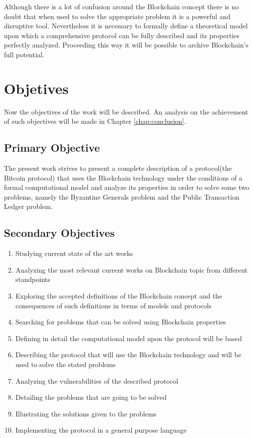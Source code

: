 \documentclass[..]{subfiles}
\begin{document}
Although there is a lot of confusion around the Blockchain concept there is no doubt that when used to solve the appropriate problem it is a powerful and disruptive tool. Nevertheless it is necessary to formally define a theoretical model upon which a comprehensive protocol can be fully described and its properties perfectly analyzed. Proceeding this way it will be possible to archive Blockchain's full potential.


\section{Objetives}

Now the objectives of the work will be described. An analysis on the achievement of such objectives will be made in Chapter \ref{chap:conclusion}.


\subsection{Primary Objective}

The present work strives to present a complete description of a protocol(the Bitcoin protocol) that uses the Blockchain technology under the conditions of a formal computational model and analyze its properties in order to solve some two problems, namely the Byzantine Generals problem and the Public Transaction Ledger problem.


\subsection{Secondary Objectives}

\begin{enumerate}
	\item Studying current state of the art works
	\item Analyzing the most relevant current works on Blockchain topic from different standpoints
	\item Exploring the accepted definitions of the Blockchain concept and the consequences of such definitions in terms of models and protocols
	\item Searching for problems that can be solved using Blockchain properties
	\item Defining in detail the computational model upon the protocol will be based
	\item Describing the protocol that will use the Blockchain technology and will be used to solve the stated problems
	\item Analyzing the vulnerabilities of the described protocol
	\item Detailing the problems that are going to be solved
	\item Illustrating the solutions given to the problems
	\item Implementing the protocol in a general purpose language
\end{enumerate}
\end{document}
